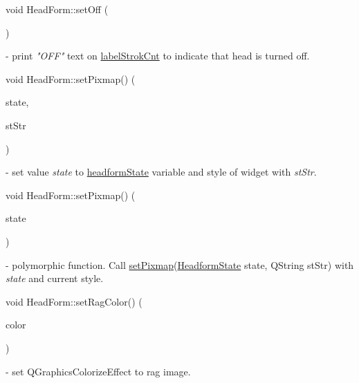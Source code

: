 \mbox{\label{classHeadForm_a75d114050b779cd5793a4968b06e8178}} 
{\footnotesize\ttfamily void Head\+Form\+::\texorpdfstring{set\+Off}{setOff} (\begin{DoxyParamCaption}{ }\end{DoxyParamCaption})} - print \textit{"OFF"} text on \hyperlink{classHeadForm_a591efe6e830fd170cb549bca142d2759}{label\+Strok\+Cnt} to indicate that head is turned off.

\mbox{\label{classHeadForm_ac2845f30dc7686178380c9c108b4c5bf}} 
{\footnotesize\ttfamily void Head\+Form\+::\texorpdfstring{set\+Pixmap()}{setPixmap()}{\footnotesize\ttfamily [1/2]} (\begin{DoxyParamCaption}\item[{\mbox{\hyperlink{classHeadForm_ae7f8ba0c9db5a5140ac4e3417dc1d9b2}{Headform\+State}}}]{state,  }\item[{Q\+String}]{st\+Str }\end{DoxyParamCaption})} - set value \textit{state} to \hyperlink{classHeadForm_a0ffd2cf8eea50202d72c4bf286a11916}{headform\+State} variable and style of widget with \textit{st\+Str}.

\mbox{\label{classHeadForm_a934e12ca808cb22f74734df9852e7146}} 
{\footnotesize\ttfamily void Head\+Form\+::\texorpdfstring{set\+Pixmap()}{setPixmap()}{\footnotesize\ttfamily [2/2]} (\begin{DoxyParamCaption}\item[{\mbox{\hyperlink{classHeadForm_ae7f8ba0c9db5a5140ac4e3417dc1d9b2}{Head\+Form\+::\+Headform\+State}}}]{state }\end{DoxyParamCaption})} - polymorphic function. Call \hyperlink{classHeadForm_ac2845f30dc7686178380c9c108b4c5bf}{set\+Pixmap}(\hyperlink{classHeadForm_ae7f8ba0c9db5a5140ac4e3417dc1d9b2}{Headform\+State} state, Q\+String st\+Str) with \textit{state} and current style.

\mbox{\label{classHeadForm_a69a9f3ad37ba31a3c1f8a5c491b6272d}} 
{\footnotesize\ttfamily void Head\+Form\+::\texorpdfstring{set\+Rag\+Color()}{setRagColor} (\begin{DoxyParamCaption}\item[{Q\+Color}]{color }\end{DoxyParamCaption})} - set Q\+Graphics\+Colorize\+Effect to rag image.

